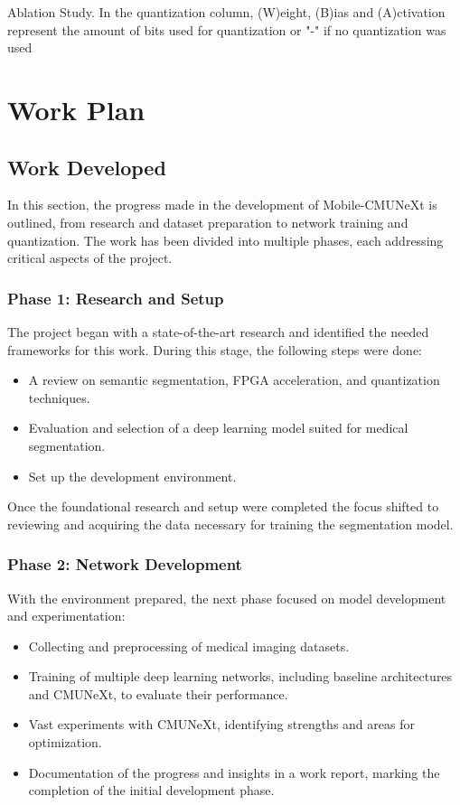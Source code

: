\documentclass[lettersize,journal]{IEEEtran}
\begin{document}
\begin{table}[!htb]
    \fittowidth{}
    \caption{Ablation Study. In the quantization column, (W)eight, (B)ias and (A)ctivation represent the amount of bits used for quantization or "-" if no quantization was used}
    \label{tab:ablation_results}
\end{table}



\section{Work Plan}

\subsection{Work Developed}
In this section, the progress made in the development of Mobile-CMUNeXt is outlined, from research and dataset preparation to network training and quantization. The work has been divided into multiple phases, each addressing critical aspects of the project.

\subsubsection{Phase 1: Research and Setup}
The project began with a state-of-the-art research and identified the needed frameworks for this work. During this stage, the following steps were done:
\begin{itemize}
    \item A review on semantic segmentation, FPGA acceleration, and quantization techniques.
    \item Evaluation and selection of a deep learning model suited for medical segmentation.
    \item Set up the development environment.
\end{itemize}

Once the foundational research and setup were completed the focus shifted to reviewing and acquiring the data necessary for training the segmentation model.

\subsubsection{Phase 2: Network Development}
With the environment prepared, the next phase focused on model development and experimentation:
\begin{itemize}
    \item Collecting and preprocessing of medical imaging datasets.
    \item Training of multiple deep learning networks, including baseline architectures and CMUNeXt, to evaluate their performance.
    \item Vast experiments with CMUNeXt, identifying strengths and areas for optimization.
    \item Documentation of the progress and insights in a work report, marking the completion of the initial development phase.
\end{itemize}
\end{document}
